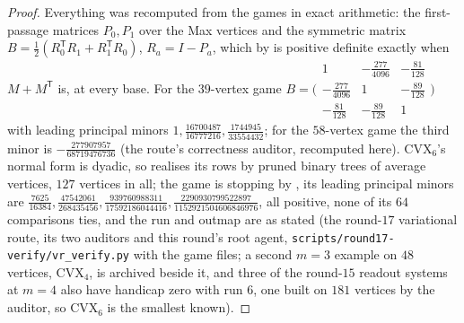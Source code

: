 \documentclass[11pt]{article}
\theoremstyle{plain}
\theoremstyle{definition}
\begin{document}
\begin{proof}
Everything was recomputed from the games in exact arithmetic: the
first-passage matrices $P_0,P_1$ over the Max vertices and the symmetric
matrix $B=\tfrac12(R_0^{\mathsf T}R_1+R_1^{\mathsf T}R_0)$, $R_a=I-P_a$,
which by  is positive definite exactly when
$M+M^{\mathsf T}$ is, at every base. For the $39$-vertex game
$B=\bigl(\begin{smallmatrix}1&-\frac{277}{4096}&-\frac{81}{128}\\
-\frac{277}{4096}&1&-\frac{89}{128}\\-\frac{81}{128}&-\frac{89}{128}&1\end{smallmatrix}\bigr)$
with leading principal minors $1,\tfrac{16700487}{16777216},\tfrac{1744945}{33554432}$;
for the $58$-vertex game the third minor is
$-\tfrac{277907957}{68719476736}$ (the route's correctness auditor,
recomputed here). $\mathrm{CVX}_6$'s normal form is dyadic, so
 realises its rows by pruned binary trees of average
vertices, $127$ vertices in all; the game is stopping by
, its leading principal minors are
$\tfrac{7625}{16384},\tfrac{47542061}{268435456},\tfrac{939760988311}{17592186044416},\tfrac{2290930799522897}{1152921504606846976}$,
all positive, none of its $64$ comparisons ties, and the run and outmap
are as stated (the round-$17$ variational route, its two auditors and
this round's root agent, \texttt{scripts/round17-verify/vr\_verify.py}
with the game files; a second $m=3$ example on $48$ vertices,
$\mathrm{CVX}_4$, is archived beside it, and three of the round-$15$
readout systems at $m=4$ also have handicap zero with run $6$, one built
on $181$ vertices by the auditor, so $\mathrm{CVX}_6$ is the smallest
known).
\end{proof}
\end{document}
